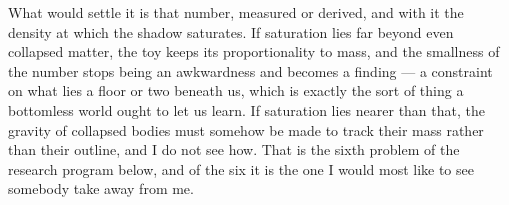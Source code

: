 What would settle it is that number, measured or derived, and with it the density at which the shadow saturates. If saturation lies far beyond even collapsed matter, the toy keeps its proportionality to mass, and the smallness of the number stops being an awkwardness and becomes a finding --- a constraint on what lies a floor or two beneath us, which is exactly the sort of thing a bottomless world ought to let us learn. If saturation lies nearer than that, the gravity of collapsed bodies must somehow be made to track their mass rather than their outline, and I do not see how. That is the sixth problem of the research program below, and of the six it is the one I would most like to see somebody take away from me.

